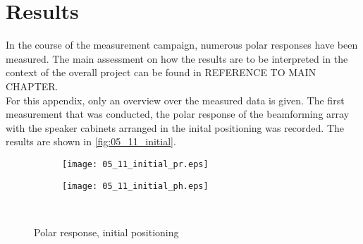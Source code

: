\section*{Results}
In the course of the measurement campaign, numerous polar responses have been measured. The main assessment on how the results are to be interpreted in the context of the overall project can be found in REFERENCE TO MAIN CHAPTER.\\
For this appendix, only an overview over the measured data is given.
The first measurement that was conducted, the polar response of the beamforming array with the speaker cabinets arranged in the inital positioning was recorded. The results are shown in \autoref{fig:05_11_initial}.
\begin{figure}[h]
\begin{subfigure}[c]{0.5\textwidth}
\texttt{[image: 05\_11\_initial\_pr.eps]}
\label{fig:05_11_init_pr}
\end{subfigure}
\begin{subfigure}[c]{0.5\textwidth}
\texttt{[image: 05\_11\_initial\_ph.eps]}
\label{fig:05_11_init_ph}
\end{subfigure}\\
\caption{Polar response, initial positioning}  
\label{fig:05_11_initial}
\end{figure}


